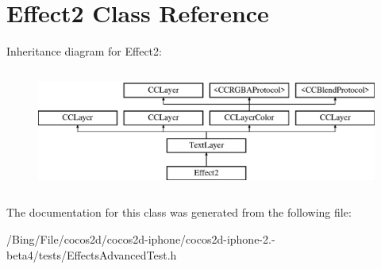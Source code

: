 \hypertarget{interface_effect2}{\section{Effect2 Class Reference}
\label{interface_effect2}
}
Inheritance diagram for Effect2\-:\begin{figure}[H]
\begin{center}
\leavevmode
\includegraphics[height=4.000000cm]{interface_effect2}
\end{center}
\end{figure}


The documentation for this class was generated from the following file\-:\begin{DoxyCompactItemize}
\item 
/\-Bing/\-File/cocos2d/cocos2d-\/iphone/cocos2d-\/iphone-\/2.-\/beta4/tests/Effects\-Advanced\-Test.\-h\end{DoxyCompactItemize}
